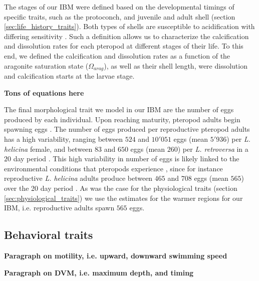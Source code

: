 The stages of our IBM were defined based on the developmental timings of specific traits, such as the protoconch, and juvenile and adult shell (section \ref{sec:life_history_traits}). Both types of shells are susceptible to acidification with differing sensitivity \citep{Bednarsek2017ApplicationPteropodShell,Thabet2015Lifestages}. Such a definition allows us to characterize the calcification and dissolution rates for each pteropod at different stages of their life. To this end, we defined the calcification and dissolution rates as a function of the aragonite saturation state ($\Omega_{arag}$), as well as their shell length, were dissolution and calcification starts at the larvae stage.


\textbf{Tons of equations here}

The final morphological trait we model in our IBM are the number of eggs produced by each individual. Upon reaching maturity, pteropod adults begin spawning eggs \citep{lalli1989pelagic,Gannefors2005Overwintering}. The number of eggs produced per reproductive pteropod adults has a high variability, ranging between $524$ and $10'051$ eggs (mean $5'936$) per \textit{L. helicina} female, and between $83$ and $650$ eggs (mean $260$) per \textit{L. retroversa} in a $20$ day period \citep{Lalli1978Reproduction}. This high variability in number of eggs is likely linked to the environmental conditions that pteropods experience \citep{Manno2016EggsAcidification}, since for instance reproductive \textit{L. helicina} adults produce between $465$ and $708$ eggs (mean $565$) over the 20 day period \citep{Paranjape1968egg}. As was the case for the physiological traits (section \ref{sec:physiological_traits}) we use the estimates for the warmer regions for our IBM, i.e. reproductive adults spawn $565$ eggs.



\subsection{Behavioral traits}

\textbf{Paragraph on motility, i.e. upward, downward swimming speed}

\textbf{Paragraph on DVM, i.e. maximum depth, and timing}






